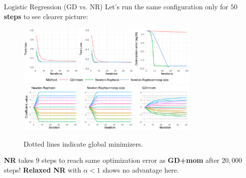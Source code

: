 \documentclass[11pt,compress,t,notes=noshow, xcolor=table]{beamer}
\begin{document}
\begin{vbframe}{Logistic Regression (GD vs. NR)}
\vspace{-0.4cm}
Let's run the same configuration only for \textbf{$50$ steps} to see clearer picture:
\begin{figure}
            \includegraphics[width=0.8\textwidth]{slides/05-multivariate-second-order/figure_man/simu-newton/NR_GD_log_indep_50iters.pdf} \\
             \includegraphics[width=0.8\textwidth]{slides/05-multivariate-second-order/figure_man/simu-newton/NR_GD_log_coef_50indep.pdf}\\
            \begin{footnotesize}
            Dotted lines indicate global minimizers.
            \end{footnotesize}
\end{figure}
\textbf{NR} takes $9$ steps to reach same optimization error as \textbf{GD+mom} after $20,000$ steps! \textbf{Relaxed NR} with $\alpha<1$ shows no advantage here.
\end{vbframe}
\end{document}
